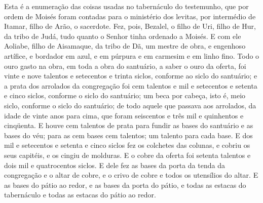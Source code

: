 Esta é a enumeração das coisas usadas no tabernáculo do
testemunho, que por ordem de Moisés foram contadas para o ministério
dos levitas, por intermédio de Itamar, filho de Arão, o sacerdote.
Fez, pois, Bezalel, o filho de Uri, filho de Hur, da tribo de
Judá, tudo quanto o Senhor tinha ordenado a Moisés. E com ele
Aoliabe, filho de Aisamaque, da tribo de Dã, um mestre de obra, e
engenhoso artífice, e bordador em azul, e em púrpura e em carmesim e
em linho fino. Todo o ouro gasto na obra, em toda a obra do
santuário, a saber o ouro da oferta, foi vinte e nove talentos e
setecentos e trinta siclos, conforme ao siclo do santuário; e
a prata dos arrolados da congregação foi cem talentos e mil e
setecentos e setenta e cinco siclos, conforme o siclo do santuário;
um beca por cabeça, isto é, meio siclo, conforme o siclo do
santuário; de todo aquele que passava aos arrolados, da idade de
vinte anos para cima, que foram seiscentos e três mil e quinhentos e
cinqüenta. E houve cem talentos de prata para fundir as bases
do santuário e as bases do véu; para as cem bases cem talentos; um
talento para cada base. E dos mil e setecentos e setenta e
cinco siclos fez os colchetes das colunas, e cobriu os seus
capitéis, e os cingiu de molduras. E o cobre da oferta foi
setenta talentos e dois mil e quatrocentos siclos. E dele fez
as bases da porta da tenda da congregação e o altar de cobre, e o
crivo de cobre e todos os utensílios do altar. E as bases do
pátio ao redor, e as bases da porta do pátio, e todas as estacas do
tabernáculo e todas as estacas do pátio ao redor.

\medskip

